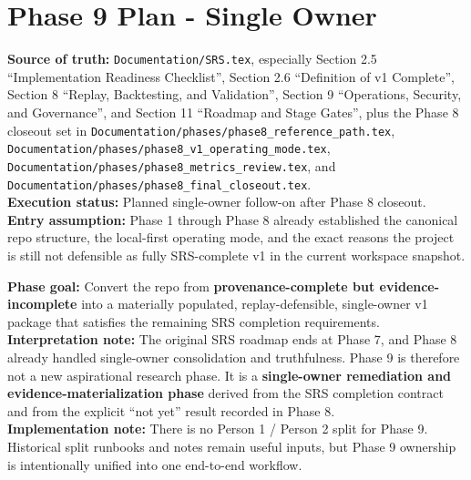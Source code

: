 \documentclass{article}
\begin{document}
\section*{Phase 9 Plan - Single Owner}

\textbf{Source of truth:} \texttt{Documentation/SRS.tex}, especially Section 2.5 ``Implementation Readiness Checklist'', Section 2.6 ``Definition of v1 Complete'', Section 8 ``Replay, Backtesting, and Validation'', Section 9 ``Operations, Security, and Governance'', and Section 11 ``Roadmap and Stage Gates'', plus the Phase 8 closeout set in \texttt{Documentation/phases/phase8\_reference\_path.tex}, \texttt{Documentation/phases/phase8\_v1\_operating\_mode.tex}, \texttt{Documentation/phases/phase8\_metrics\_review.tex}, and \texttt{Documentation/phases/phase8\_final\_closeout.tex}.\\
\textbf{Execution status:} Planned single-owner follow-on after Phase 8 closeout.\\
\textbf{Entry assumption:} Phase 1 through Phase 8 already established the canonical repo structure, the local-first operating mode, and the exact reasons the project is still not defensible as fully SRS-complete v1 in the current workspace snapshot.

\textbf{Phase goal:} Convert the repo from \textbf{provenance-complete but evidence-incomplete} into a materially populated, replay-defensible, single-owner v1 package that satisfies the remaining SRS completion requirements.\\
\textbf{Interpretation note:} The original SRS roadmap ends at Phase 7, and Phase 8 already handled single-owner consolidation and truthfulness. Phase 9 is therefore not a new aspirational research phase. It is a \textbf{single-owner remediation and evidence-materialization phase} derived from the SRS completion contract and from the explicit ``not yet'' result recorded in Phase 8.\\
\textbf{Implementation note:} There is no Person 1 / Person 2 split for Phase 9. Historical split runbooks and notes remain useful inputs, but Phase 9 ownership is intentionally unified into one end-to-end workflow.
\end{document}
